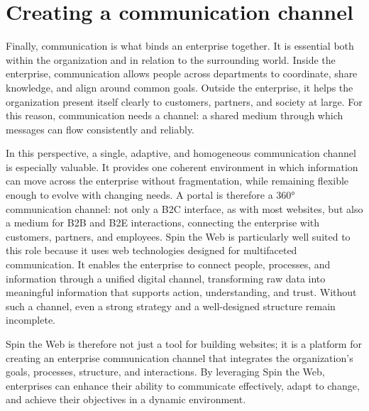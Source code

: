 \section{Creating a communication channel}

Finally, communication is what binds an enterprise together. It is essential both within the organization and in relation to the surrounding world. Inside the enterprise, communication allows people across departments to coordinate, share knowledge, and align around common goals. Outside the enterprise, it helps the organization present itself clearly to customers, partners, and society at large. For this reason, communication needs a channel: a shared medium through which messages can flow consistently and reliably.

In this perspective, a single, adaptive, and homogeneous communication channel is especially valuable. It provides one coherent environment in which information can move across the enterprise without fragmentation, while remaining flexible enough to evolve with changing needs. A portal is therefore a 360° communication channel: not only a B2C interface, as with most websites, but also a medium for B2B and B2E interactions, connecting the enterprise with customers, partners, and employees. Spin the Web is particularly well suited to this role because it uses web technologies designed for multifaceted communication. It enables the enterprise to connect people, processes, and information through a unified digital channel, transforming raw data into meaningful information that supports action, understanding, and trust. Without such a channel, even a strong strategy and a well-designed structure remain incomplete.

Spin the Web is therefore not just a tool for building websites; it is a platform for creating an enterprise communication channel that integrates the organization's goals, processes, structure, and interactions. By leveraging Spin the Web, enterprises can enhance their ability to communicate effectively, adapt to change, and achieve their objectives in a dynamic environment.